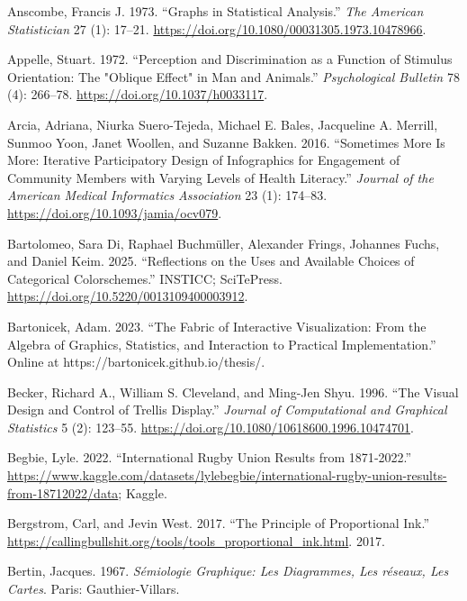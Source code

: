 \documentclass[
  letterpaper,
  DIV=11,
  numbers=noendperiod]{scrreprt}
\newlength{\cslhangindent}
\newenvironment{CSLReferences}[2] %
 {\begin{list}{}{%
  \setlength{\itemindent}{0pt}
  \setlength{\leftmargin}{0pt}
  \setlength{\parsep}{0pt}
  \ifodd #1
   \setlength{\leftmargin}{\cslhangindent}
   \setlength{\itemindent}{-1\cslhangindent}
  \fi
  \setlength{\itemsep}{#2\baselineskip}}}
 {\end{list}}
\begin{document}
\begin{CSLReferences}{1}{0}
Anscombe, Francis J. 1973. {``Graphs in Statistical Analysis.''}
\emph{The American Statistician} 27 (1): 17--21.
\url{https://doi.org/10.1080/00031305.1973.10478966}.

Appelle, Stuart. 1972. {``Perception and Discrimination as a Function of
Stimulus Orientation: The "Oblique Effect" in Man and Animals.''}
\emph{Psychological Bulletin} 78 (4): 266--78.
\url{https://doi.org/10.1037/h0033117}.

Arcia, Adriana, Niurka Suero-Tejeda, Michael E. Bales, Jacqueline A.
Merrill, Sunmoo Yoon, Janet Woollen, and Suzanne Bakken. 2016.
{``Sometimes More Is More: Iterative Participatory Design of
Infographics for Engagement of Community Members with Varying Levels of
Health Literacy.''} \emph{Journal of the American Medical Informatics
Association} 23 (1): 174--83.
\url{https://doi.org/10.1093/jamia/ocv079}.

Bartolomeo, Sara Di, Raphael Buchmüller, Alexander Frings, Johannes
Fuchs, and Daniel Keim. 2025. {``Reflections on the Uses and Available
Choices of Categorical Colorschemes.''} INSTICC; SciTePress.
\url{https://doi.org/10.5220/0013109400003912}.

Bartonicek, Adam. 2023. {``The Fabric of Interactive Visualization: From
the Algebra of Graphics, Statistics, and Interaction to Practical
Implementation.''} Online at https://bartonicek.github.io/thesis/.

Becker, Richard A., William S. Cleveland, and Ming-Jen Shyu. 1996.
{``The Visual Design and Control of Trellis Display.''} \emph{Journal of
Computational and Graphical Statistics} 5 (2): 123--55.
\url{https://doi.org/10.1080/10618600.1996.10474701}.

Begbie, Lyle. 2022. {``International Rugby Union Results from
1871‑2022.''}
\url{https://www.kaggle.com/datasets/lylebegbie/international-rugby-union-results-from-18712022/data};
Kaggle.

Bergstrom, Carl, and Jevin West. 2017. {``The Principle of Proportional
Ink.''}
\url{https://callingbullshit.org/tools/tools_proportional_ink.html}.
2017.

Bertin, Jacques. 1967. \emph{S{é}miologie Graphique: Les Diagrammes, Les
r{é}seaux, Les Cartes}. Paris: Gauthier-Villars.


\end{CSLReferences}
\end{document}
